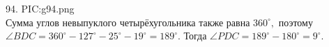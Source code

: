 94. {{PIC:g94.png}}\\
Сумма углов невыпуклого четырёхугольника также равна $360^\circ,$ поэтому $\angle BDC=360^\circ-127^\circ-25^\circ-19^\circ=189^\circ.$ Тогда $\angle PDC=189^\circ-180^\circ=9^\circ.$\\
